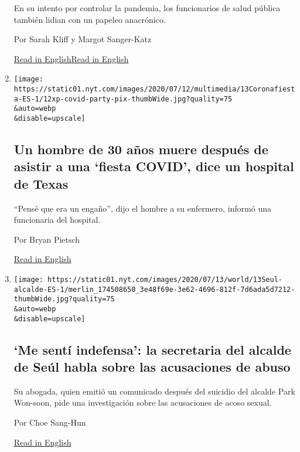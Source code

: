\begin{enumerate}
  En su intento por controlar la pandemia, los funcionarios de salud
  pública también lidian con un papeleo anacrónico.

  Por Sarah Kliff y Margot Sanger-Katz

  \href{https://www.nytimes.com/2020/07/13/upshot/coronavirus-response-fax-machines.html}{Read
  in
  English}\href{https://www.nytimes.com/2020/07/13/upshot/coronavirus-response-fax-machines.html}{Read
  in English}
\item
  \href{/es/2020/07/13/espanol/mundo/fiesta-covid.html}{}

  \texttt{[image: https://static01.nyt.com/images/2020/07/12/multimedia/13Coronafiesta-ES-1/12xp-covid-party-pix-thumbWide.jpg?quality=75\\\&auto=webp\\\&disable=upscale]}

  \hypertarget{un-hombre-de-30-auxf1os-muere-despuuxe9s-de-asistir-a-una-fiesta-covid-dice-un-hospital-de-texas}{%
  \subsection{Un hombre de 30 años muere después de asistir a una
  `fiesta COVID', dice un hospital de
  Texas}\label{un-hombre-de-30-auxf1os-muere-despuuxe9s-de-asistir-a-una-fiesta-covid-dice-un-hospital-de-texas}}

  ``Pensé que era un engaño'', dijo el hombre a su enfermero, informó
  una funcionaria del hospital.

  Por Bryan Pietsch

  \href{https://www.nytimes.com/2020/07/12/us/30-year-old-covid-party-death.html}{Read
  in English}
\item
  \href{/es/2020/07/13/espanol/mundo/park-won-soon-suicidio.html}{}

  \texttt{[image: https://static01.nyt.com/images/2020/07/13/world/13Seul-alcalde-ES-1/merlin\_174508650\_3e48f69e-3e62-4696-812f-7d6ada5d7212-thumbWide.jpg?quality=75\\\&auto=webp\\\&disable=upscale]}

  \hypertarget{me-sentuxed-indefensa-la-secretaria-del-alcalde-de-seuxfal-habla-sobre-las-acusaciones-de-abuso}{%
  \subsection{`Me sentí indefensa': la secretaria del alcalde de Seúl
  habla sobre las acusaciones de
  abuso}\label{me-sentuxed-indefensa-la-secretaria-del-alcalde-de-seuxfal-habla-sobre-las-acusaciones-de-abuso}}

  Su abogada, quien emitió un comunicado después del suicidio del
  alcalde Park Won-soon, pide una investigación sobre las acusaciones de
  acoso sexual.

  Por Choe Sang-Hun

  \href{https://www.nytimes.com/2020/07/13/world/asia/seoul-mayor-sexual-harassment.html}{Read
  in English}
\end{enumerate}

